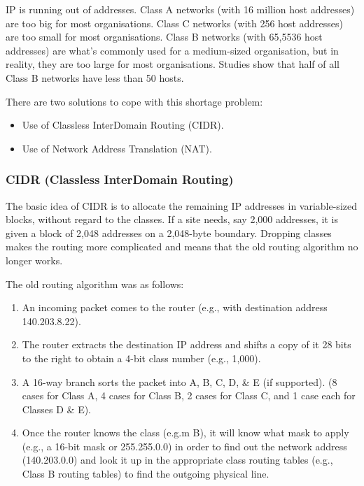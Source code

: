\documentclass[11pt]{article}
\begin{document}
IP is running out of addresses. 
Class A networks (with 16 million host addresses) are too big for most organisations. 
Class C networks (with 256 host addresses) are too small for most organisations. 
Class B networks (with 65,5536 host addresses) are what's commonly used for a medium-sized organisation, but in reality, they 
are too large for most organisations. 
Studies show that half of all Class B networks have less than 50 hosts. 

There are two solutions to cope with this shortage problem: 
\begin{itemize}
    \item   Use of Classless InterDomain Routing (CIDR). 
    \item   Use of Network Address Translation (NAT). 
\end{itemize}

\subsubsection{CIDR (Classless InterDomain Routing)}
The basic idea of CIDR is to allocate the remaining IP addresses in variable-sized blocks, without regard to the classes.
If a site needs, say 2,000 addresses, it is given a block of 2,048 addresses on a 2,048-byte boundary.
Dropping classes makes the routing more complicated and means that the old routing algorithm no longer works. 

The old routing algorithm was as follows: 
\begin{enumerate} 
    \item   An incoming packet comes to the router (e.g., with destination address 140.203.8.22). 
    \item   The router extracts the destination IP address and shifts a copy of it 28 bits to the right to obtain a 4-bit class number 
            (e.g., 1,000). 
    \item   A 16-way branch sorts the packet into A, B, C, D, \& E (if supported). 
            (8 cases for Class A, 4 cases for Class B, 2 cases for Class C, and 1 case each for Classes D \& E).
    \item   Once the router knows the class (e.g.m B), it will know what mask to apply (e.g., a 16-bit mask or 255.255.0.0)
            in order to find out the network address (140.203.0.0) and look it up in the appropriate class routing tables (e.g., Class 
            B routing tables) to find the outgoing physical line.
\end{enumerate}
\end{document}
